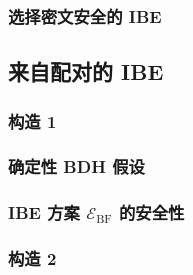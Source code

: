 \begin{theorem}\label{theo:15-5}
	
\end{theorem}

\subsubsection{选择密文安全的 IBE}\label{subsubsec:15-6-2-3}

\subsection{来自配对的 IBE}\label{subsec:15-6-3}

\subsubsection{构造 1}\label{subsubsec:15-6-3-1}

\subsubsection{确定性 BDH 假设}\label{subsubsec:15-6-3-2}

\begin{game}\label{game:15-7}
	
\end{game}

\begin{definition}\label{def:15-11}
	
\end{definition}

\subsubsection{IBE 方案 $\mathcal{E}_\mathrm{BF}$ 的安全性}\label{subsubsec:15-6-3-3}

\begin{theorem}\label{theo:15-6}
	
\end{theorem}

\subsubsection{构造 2}\label{subsubsec:15-6-3-4}

\begin{theorem}\label{theo:15-7}
	
\end{theorem}

